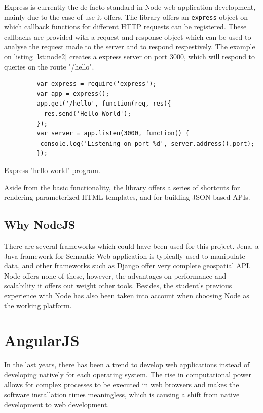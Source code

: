 Express is currently the de facto standard in Node web application development, mainly due to the ease of use it offers. The library offers an \texttt{express} object on which callback functions for different HTTP requests can be registered. These callbacks are provided with a request and response object which can be used to analyse the request made to the server and to respond respestively. The example on listing \ref{lst:node2} creates a express server on port 3000, which will respond to queries on the route "/hello".

\begin{listing}\centering
  \begin{minipage}{.6\textwidth}
    \begin{verbatim}
	     var express = require('express');
	     var app = express();
	     app.get('/hello', function(req, res){
	       res.send('Hello World');
	     });
	     var server = app.listen(3000, function() {
	      console.log('Listening on port %d', server.address().port);
	     });
    \end{verbatim}
  \end{minipage}
  \caption{Express "hello world" program.}\label{lst:node2}
\end{listing}

Aside from the basic functionality, the library offers a series of shortcuts for rendering parameterized HTML templates, and for building JSON based APIs.

\subsection*{Why NodeJS}

There are several frameworks which could have been used for this project. Jena, a Java framework for Semantic Web application is typically used to manipulate data, and other frameworks such as Django offer very complete geospatial API. Node offers none of these, however, the advantages on performance and scalability it offers out weight other tools. Besides, the student's previous experience with Node has also been taken into account when choosing Node as the working platform.
 
\section*{AngularJS}

In the last years, there has been a trend to develop web applications instead of developing natively for each operating system. The rise in computational power allows for complex processes to be executed in web browsers and makes the software installation times meaningless, which is causing a shift from native development to web development.


